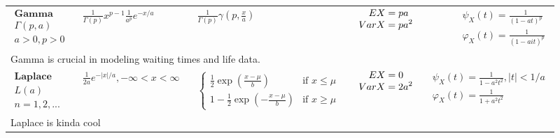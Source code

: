 \documentclass{article}
\begin{document}
\begin{landscape}
\begin{table}[ht]
\begin{tabular}{@{}l p{6.0cm} p{5cm} p{3.0cm} r@{}}
$\begin{array}{l}
    \textbf{Gamma} \\
    \Gamma(p, a) \\
    a > 0, p > 0
\end{array}$ & 

$\begin{array}{l}
\displaystyle  \frac{1}{\Gamma(p)} x^{p-1} \frac{1}{a^p} e^{-x/a} \\
\end{array}$ & 
$\begin{array}{l}
    \displaystyle  \frac{1}{\Gamma(p)} \gamma \left(p, \frac{x}{a}\right)
\end{array}$ & 
$\begin{array}{l}
\displaystyle \hspace{0.36cm} EX = pa \\
\displaystyle VarX = pa^2
\end{array}$ & 
$\begin{array}{r}
\displaystyle \psi_X(t) = \frac{1}{(1 - a t)^{p}} \\
\displaystyle \varphi_X(t) = \frac{1}{(1 - a it)^{p}}
\end{array}$ \\
\multicolumn{4}{p{19cm}}{Gamma is crucial in modeling waiting times and life data.} \\

$\begin{array}{l}
    \textbf{Laplace} \\
    L(a) \\
    n = 1, 2,...
\end{array}$ & 

$\begin{array}{l}
\displaystyle \frac{1}{2a}e^{-|x|/a}, -\infty < x <\infty \\
\end{array}$ & 
$\begin{array}{l}
   {\displaystyle {\begin{cases}{\frac {1}{2}}\exp \left({\frac {x-\mu }{b}}\right)&{\text{if }}x\leq \mu \\[8pt]1-{\frac {1}{2}}\exp \left(-{\frac {x-\mu }{b}}\right)&{\text{if }}x\geq \mu \end{cases}}}
\end{array}$ & 
$\begin{array}{l}
\displaystyle \hspace{0.36cm} EX = 0 \\
\displaystyle VarX = 2a^2\\
\end{array}$ & 
$\begin{array}{r}
\displaystyle \psi_X(t) = {\displaystyle {\frac {1}{1-a^{2}t^{2}}}}, |t|<1/a\\
\displaystyle \varphi_X(t) = {\displaystyle {\frac {1}{1+a^{2}t^{2}}}}
\end{array}$ \\
\multicolumn{4}{p{19cm}}{Laplace is kinda cool} \\



\end{tabular}
\end{table}
\end{landscape}
\end{document}
